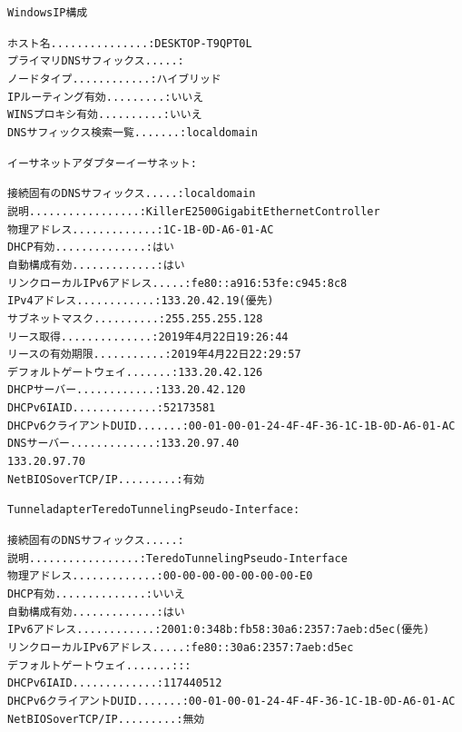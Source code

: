 \documentclass[10pt]{article}
\begin{document}
\begin{alltt}
Windows IP 構成

ホスト名. . . . . . . . . . . . . . .: DESKTOP-T9QPT0L
プライマリ DNS サフィックス . . . . .: 
ノード タイプ . . . . . . . . . . . .: ハイブリッド
IP ルーティング有効 . . . . . . . . .: いいえ
WINS プロキシ有効 . . . . . . . . . .: いいえ
DNS サフィックス検索一覧. . . . . . .: localdomain

イーサネット アダプター イーサネット:

接続固有の DNS サフィックス . . . . .: localdomain
説明. . . . . . . . . . . . . . . . .: Killer E2500 Gigabit Ethernet Controller
物理アドレス. . . . . . . . . . . . .: 1C-1B-0D-A6-01-AC
DHCP 有効 . . . . . . . . . . . . . .: はい
自動構成有効. . . . . . . . . . . . .: はい
リンクローカル IPv6 アドレス. . . . .: fe80::a916:53fe:c945:8c8%
IPv4 アドレス . . . . . . . . . . . .: 133.20.42.19(優先) 
サブネット マスク . . . . . . . . . .: 255.255.255.128
リース取得. . . . . . . . . . . . . .: 2019年4月22日 19:26:44
リースの有効期限. . . . . . . . . . .: 2019年4月22日 22:29:57
デフォルト ゲートウェイ . . . . . . .: 133.20.42.126
DHCP サーバー . . . . . . . . . . . .: 133.20.42.120
DHCPv6 IAID . . . . . . . . . . . . .: 52173581
DHCPv6 クライアント DUID. . . . . . .: 00-01-00-01-24-4F-4F-36-1C-1B-0D-A6-01-AC
DNS サーバー. . . . . . . . . . . . .: 133.20.97.40
133.20.97.70
NetBIOS over TCP/IP . . . . . . . . .: 有効

Tunnel adapter Teredo Tunneling Pseudo-Interface:

接続固有の DNS サフィックス . . . . .: 
説明. . . . . . . . . . . . . . . . .: Teredo Tunneling Pseudo-Interface
物理アドレス. . . . . . . . . . . . .: 00-00-00-00-00-00-00-E0
DHCP 有効 . . . . . . . . . . . . . .: いいえ
自動構成有効. . . . . . . . . . . . .: はい
IPv6 アドレス . . . . . . . . . . . .: 2001:0:348b:fb58:30a6:2357:7aeb:d5ec(優先) 
リンクローカル IPv6 アドレス. . . . .: fe80::30a6:2357:7aeb:d5ec%
デフォルト ゲートウェイ . . . . . . .: ::
DHCPv6 IAID . . . . . . . . . . . . .: 117440512
DHCPv6 クライアント DUID. . . . . . .: 00-01-00-01-24-4F-4F-36-1C-1B-0D-A6-01-AC
NetBIOS over TCP/IP . . . . . . . . .: 無効
\end{alltt}
\noindent\makebox[\linewidth]{\rule{\paperwidth}{0.4pt}}
\end{document}
